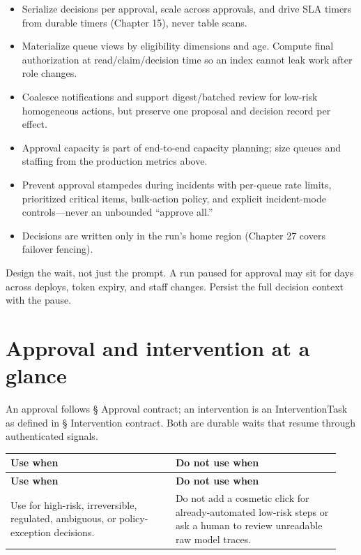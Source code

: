 \begin{itemize}

\item Serialize decisions per approval, scale across approvals, and drive SLA timers from durable timers (Chapter 15), never table scans.

\item Materialize queue views by eligibility dimensions and age. Compute final authorization at read/claim/decision time so an index cannot leak work after role changes.

\item Coalesce notifications and support digest/batched review for low-risk homogeneous actions, but preserve one proposal and decision record per effect.

\item Approval capacity is part of end-to-end capacity planning; size queues and staffing from the production metrics above.

\item Prevent approval stampedes during incidents with per-queue rate limits, prioritized critical items, bulk-action policy, and explicit incident-mode controls—never an unbounded “approve all.”

\item Decisions are written only in the run's home region (Chapter 27 covers failover fencing).

\end{itemize}

\begin{bookproduction}
Design the wait, not just the prompt. A run paused for approval may sit for days across deploys, token expiry, and staff changes. Persist the full decision context with the pause.
\end{bookproduction}

\section{Approval and intervention at a glance}

An approval follows § Approval contract; an intervention is an InterventionTask as defined in § Intervention contract. Both are durable waits that resume through authenticated signals.\par

\BookTableStart
\small
\begin{longtable}{@{}Y{0.4700\linewidth}Y{0.4700\linewidth}@{}}
\color{white}\bfseries \textbf{Use when} & \color{white}\bfseries \textbf{Do not use when} \\
\endfirsthead
{}
\color{white}\bfseries \textbf{Use when} & \color{white}\bfseries \textbf{Do not use when} \\
\endhead
Use for high-risk, irreversible, regulated, ambiguous, or policy-exception decisions. & Do not add a cosmetic click for already-automated low-risk steps or ask a human to review unreadable raw model traces. \\
\end{longtable}
\BookTableEnd

